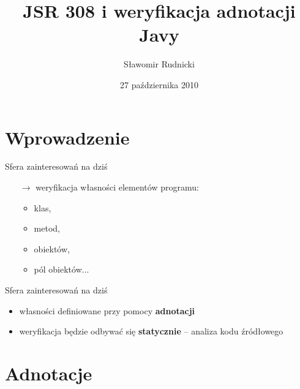 \documentclass{beamer}
\title{JSR 308 i weryfikacja adnotacji Javy}
\author{Sławomir Rudnicki}
\institute{Niezawodność systemów współbieżnych i obiektowych}
\date{27 października 2010}
\begin{document}
\begin{frame}
  \titlepage
\end{frame}
\begin{frame}
  \tableofcontents[pausesections]
\end{frame}

\setcounter{tocdepth}{2}

\section{Wprowadzenie}

\begin{frame}{Sfera zainteresowań na dziś}
\begin{itemize}
\item[$\rightarrow$] weryfikacja własności elementów programu:
\begin{itemize}
\item klas, 
\item metod, 
\item obiektów, 
\item pól obiektów...
\end{itemize}
\end{itemize}
\end{frame}

\begin{frame}{Sfera zainteresowań na dziś}
\begin{itemize}
\item<1->[$\rightarrow$] własności definiowane przy pomocy \textbf{adnotacji}
\begin{center}

\end{center}
\item<2->[$\rightarrow$] weryfikacja będzie odbywać się \textbf{statycznie} -- analiza kodu źródłowego
\end{itemize}
\end{frame}

\section{Adnotacje}
\end{document}
